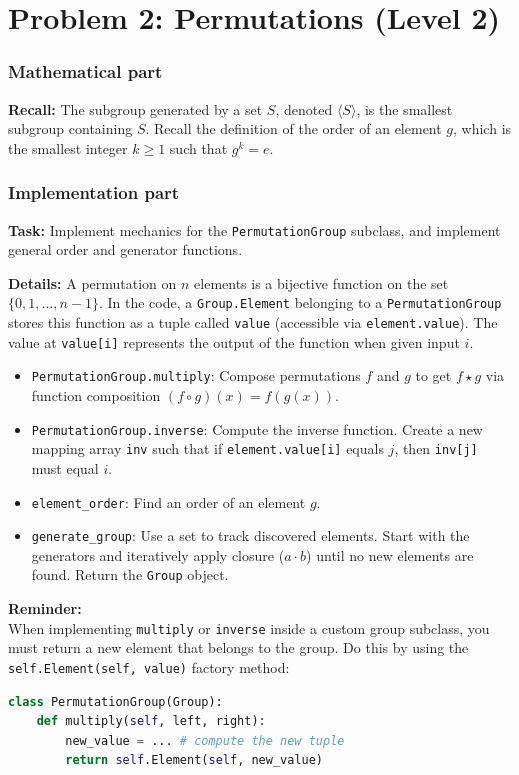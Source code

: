\documentclass[11pt]{article}
\begin{document}
\vspace{1cm}

\section*{Problem 2: Permutations (Level 2)}

\subsubsection*{Mathematical part}
\textbf{Recall:} The subgroup generated by a set $S$, denoted $\langle S \rangle$, is the smallest subgroup containing $S$. Recall the definition of the order of an element $g$, which is the smallest integer $k \ge 1$ such that $g^k = e$.

\subsubsection*{Implementation part}
\textbf{Task:} Implement mechanics for the \lstinline|PermutationGroup| subclass, and implement general order and generator functions.

\textbf{Details:} A permutation on $n$ elements is a bijective function on the set $\{0, 1, \dots, n-1\}$. In the code, a \lstinline|Group.Element| belonging to a \lstinline|PermutationGroup| stores this function as a tuple called \lstinline|value| (accessible via \lstinline|element.value|). The value at \lstinline|value[i]| represents the output of the function when given input $i$.

\begin{itemize}
    \item \lstinline|PermutationGroup.multiply|: Compose permutations $f$ and $g$ to get $f \star g$ via function composition $(f \circ g)(x) = f(g(x))$.
    \item \lstinline|PermutationGroup.inverse|: Compute the inverse function. Create a new mapping array \lstinline|inv| such that if \lstinline|element.value[i]| equals $j$, then \lstinline|inv[j]| must equal $i$.
    \item \lstinline|element_order|: Find an order of an element $g$.
    \item \lstinline|generate_group|: Use a set to track discovered elements. Start with the generators and iteratively apply closure ($a \cdot b$) until no new elements are found. Return the \lstinline|Group| object.
\end{itemize}


\textbf{Reminder:}\\
When implementing \lstinline|multiply| or \lstinline|inverse| inside a custom group subclass, you must return a new element that belongs to the group. Do this by using the \lstinline|self.Element(self, value)| factory method:
\begin{lstlisting}[language=Python]
class PermutationGroup(Group):
    def multiply(self, left, right):
        new_value = ... # compute the new tuple
        return self.Element(self, new_value)
\end{lstlisting}
\end{document}

